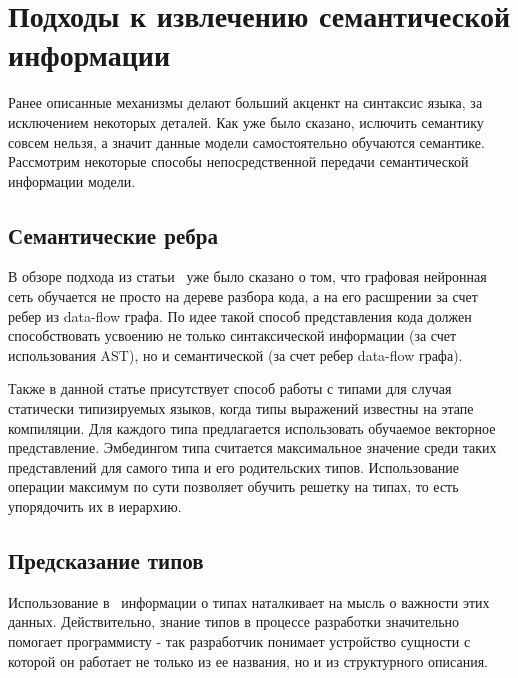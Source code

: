 \documentclass[times,specification,annotation]{itmo-student-thesis}
\begin{document}
\section{Подходы к извлечению семантической информации}\label{sec:semantic}
Ранее описанные механизмы делают больший акценкт на синтаксис языка, за исключением некоторых деталей. Как уже было сказано, ислючить семантику совсем нельзя, а значит данные модели самостоятельно обучаются семантике. Рассмотрим некоторые способы непосредственной передачи семантической информации модели.

\subsection{Семантические ребра}\label{sec:semanticEdges}
В обзоре подхода из статьи~\cite{gated-graphs-nn} уже было сказано о том, что графовая нейронная сеть обучается не просто на дереве разбора кода, а на его расшрении за счет ребер из data-flow графа. По идее такой способ представления кода должен способствовать усвоению не только синтаксической информации (за счет использования AST), но и семантической (за счет ребер data-flow графа).

Также в данной статье присутствует способ работы с типами для случая статически типизируемых языков, когда типы выражений известны на этапе компиляции. Для каждого типа предлагается использовать обучаемое векторное представление. Эмбедингом типа считается максимальное значение среди таких представлений для самого типа и его родительских типов. Использование операции максимум по сути позволяет обучить решетку на типах, то есть упорядочить их в иерархию.

\subsection{Предсказание типов}\label{sec:lambdanet}
Использование в~\cite{gated-graphs-nn} информации о типах наталкивает на мысль о важности этих данных. Действительно, знание типов в процессе разработки значительно помогает программисту - так разработчик понимает устройство сущности с которой он работает не только из ее названия, но и из структурного описания. 
\end{document}
